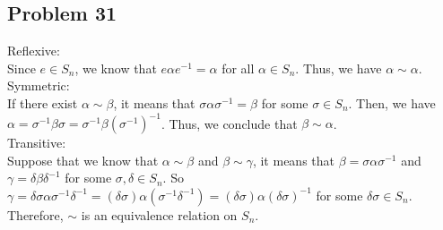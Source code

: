 \subsection*{Problem 31}
\noindent Reflexive: \\
Since $e \in S_n$, we know that $e \alpha e^{-1} = \alpha$ for all $\alpha \in S_n$. Thus, we have $\alpha \sim \alpha$. \\
Symmetric: \\
If there exist $\alpha \sim \beta$, it means that $\sigma \alpha \sigma^{-1} = \beta$ for some $\sigma \in S_n$. Then, we have $\alpha = \sigma^{-1} \beta \sigma = \sigma^{-1} \beta (\sigma^{-1})^{-1}$. Thus, we conclude that $\beta \sim \alpha$. \\
Transitive: \\
Suppose that we know that $\alpha \sim \beta$ and $\beta \sim \gamma$, it means that $\beta = \sigma \alpha \sigma^{-1}$ and $\gamma = \delta \beta \delta^{-1}$ for some $\sigma, \delta \in S_n$.
So $\gamma = \delta \sigma \alpha \sigma^{-1} \delta^{-1} = (\delta \sigma) \alpha (\sigma^{-1} \delta^{-1}) = (\delta \sigma) \alpha (\delta \sigma)^{-1}$ for some $\delta \sigma \in S_n$. \\

\noindent Therefore, $\sim$ is an equivalence relation on $S_n$.

